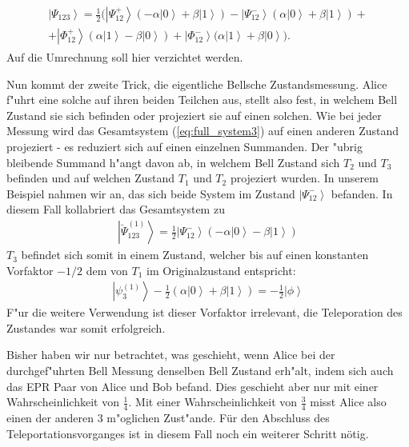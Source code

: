 \begin{refsection}
\begin{align}\label{eq:full_system3}
	\begin{split}
\left| \Psi_{123} \right\rangle = \frac{1}{2} \Bigg( \left| \Psi_{12}^{+} \right\rangle (-\alpha \left| 0 \right\rangle + \beta \left| 1 \right\rangle) - \left| \Psi_{12}^{-} \right\rangle (\alpha \left| 0 \right\rangle + \beta \left| 1 \right\rangle ) +
\\
+ \left| \Phi_{12}^{+} \right\rangle (\alpha \left| 1 \right\rangle - \beta \left| 0 \right\rangle) + \left| \Phi_{12}^{-} \right\rangle (\alpha \left| 1 \right\rangle + \beta \left| 0 \right\rangle
 \Bigg).
 \end{split}
\end{align}
Auf die Umrechnung soll hier verzichtet werden.

Nun kommt der zweite Trick, die eigentliche Bellsche Zustandsmessung. Alice f"uhrt eine solche auf ihren beiden Teilchen aus, stellt also fest, in welchem Bell Zustand sie sich befinden oder projeziert sie auf einen solchen. Wie bei jeder Messung wird das Gesamtsystem (\ref{eq:full_system3}) auf einen anderen Zustand projeziert - es reduziert sich auf einen einzelnen Summanden. Der "ubrig bleibende Summand h"angt davon ab, in welchem Bell Zustand sich $T_{2}$ und $T_{3}$ befinden und auf welchen Zustand $T_{1}$ und $T_{2}$ projeziert wurden. In unserem Beispiel nahmen wir an, das sich beide System im Zustand $\left|\Psi_{12}^{-}\right\rangle$ befanden. In diesem Fall kollabriert das Gesamtsystem zu
\begin{align}
\left| \breve{\Psi}_{123}^{(1)} \right\rangle = \frac{1}{2} \left| \Psi_{12}^{-} \right \rangle (-\alpha \left| 0 \right \rangle - \beta \left| 1 \right\rangle)
\end{align}
$T_{3}$ befindet sich somit in einem Zustand, welcher bis auf einen konstanten Vorfaktor $-1/2$ dem von $T_{1}$ im Originalzustand entspricht:
\begin{align}
\left| \psi_{3}^{(1)} \right\rangle - \frac{1}{2} \left( \alpha \left| 0 \right \rangle + \beta \left| 1 \right \rangle \right ) = - \frac{1}{2} \left| \phi \right \rangle
\end{align}
F"ur die weitere Verwendung ist dieser Vorfaktor irrelevant, die Teleporation des Zustandes war somit erfolgreich. 

Bisher haben wir  nur betrachtet, was geschieht, wenn Alice bei der durchgef"uhrten Bell Messung denselben Bell Zustand erh"alt, indem sich auch das EPR Paar von Alice und Bob befand. Dies geschieht aber nur mit einer Wahrscheinlichkeit von $\frac{1}{4}$. Mit einer Wahrscheinlichkeit von $\frac{3}{4}$ misst Alice also einen der anderen 3 m"oglichen Zust"ande. Für den Abschluss des Teleportationsvorganges ist in diesem Fall noch ein weiterer Schritt nötig.


\end{refsection}
